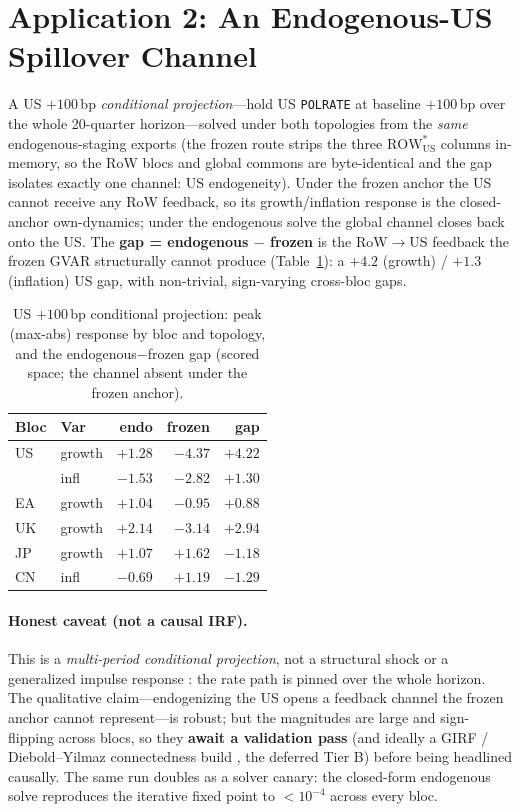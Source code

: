 \documentclass[11pt]{article}
\begin{document}
\section{Application 2: An Endogenous-US Spillover Channel}
\label{sec:spillover}

A US $+100$\,bp \emph{conditional projection}---hold US \texttt{POLRATE} at baseline $+100$\,bp over the
whole 20-quarter horizon---solved under both topologies from the \emph{same} endogenous-staging exports
(the frozen route strips the three $\text{ROW}^{*}_\text{US}$ columns in-memory, so the RoW blocs and
global commons are byte-identical and the gap isolates exactly one channel: US endogeneity). Under the
frozen anchor the US cannot receive any RoW feedback, so its growth/inflation response is the
closed-anchor own-dynamics; under the endogenous solve the global channel closes back onto the US. The
\textbf{gap = endogenous $-$ frozen} is the RoW$\to$US feedback the frozen GVAR structurally cannot
produce (Table~\ref{tab:spillover}): a $+4.2$ (growth) / $+1.3$ (inflation) US gap, with non-trivial,
sign-varying cross-bloc gaps.

\begin{table}[t]
\centering
\caption{US $+100$\,bp conditional projection: peak (max-abs) response by bloc and topology, and the
endogenous$-$frozen gap (scored space; the channel absent under the frozen anchor).}
\label{tab:spillover}
\begin{tabular}{@{}llrrr@{}}
\toprule
Bloc & Var & endo & frozen & gap \\
\midrule
US & growth & $+1.28$ & $-4.37$ & $\mathbf{+4.22}$ \\
   & infl   & $-1.53$ & $-2.82$ & $+1.30$ \\
EA & growth & $+1.04$ & $-0.95$ & $+0.88$ \\
UK & growth & $+2.14$ & $-3.14$ & $+2.94$ \\
JP & growth & $+1.07$ & $+1.62$ & $-1.18$ \\
CN & infl   & $-0.69$ & $+1.19$ & $-1.29$ \\
\bottomrule
\end{tabular}
\end{table}

\paragraph{Honest caveat (not a causal IRF).} This is a \emph{multi-period conditional projection}, not
a structural shock or a generalized impulse response \citep{PesaranShin1998}: the rate path is pinned
over the whole horizon. The qualitative claim---endogenizing the US opens a feedback channel the frozen
anchor cannot represent---is robust; but the magnitudes are large and sign-flipping across blocs, so
they \textbf{await a validation pass} (and ideally a GIRF / Diebold--Yilmaz connectedness build
\citep{DieboldYilmaz2012}, the deferred Tier B) before being headlined causally. The same run doubles as
a solver canary: the closed-form endogenous solve reproduces the iterative fixed point to $<10^{-4}$
across every bloc.
\end{document}
